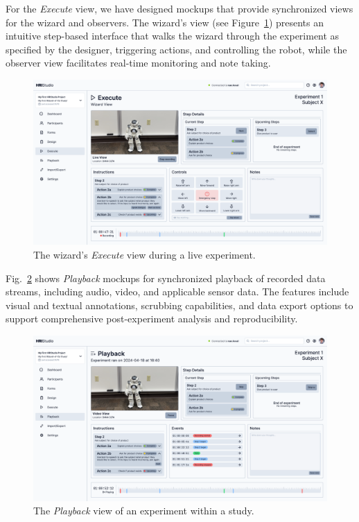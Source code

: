 \documentclass[letterpaper, 10 pt, conference]{ieeeconf}
\begin{document}
For the \emph{Execute} view, we have designed mockups that provide synchronized views for the wizard and observers. The wizard's view (see Figure~\ref{fig:execute}) presents an intuitive step-based interface that walks the wizard through the experiment as specified by the designer, triggering actions, and controlling the robot, while the observer view facilitates real-time monitoring and note taking.

\begin{figure}
\vskip -0.3cm
    \centering
        \includegraphics[width=0.4\paperwidth]{assets/mockups/execute}
         \vskip -0.3cm
        \caption{The wizard's \emph{Execute} view during a live experiment.}
        \label{fig:execute}
    \vskip -0.9cm
\end{figure}

Fig.~\ref{fig:playback} shows \emph{Playback} mockups for synchronized playback of recorded data streams, including audio, video, and applicable sensor data. The features include visual and textual annotations, scrubbing capabilities, and data export options to support comprehensive post-experiment analysis and reproducibility.

\begin{figure}
    \centering
        \includegraphics[width=0.4\paperwidth]{assets/mockups/playback}
        \vskip -0.3cm
        \caption{The \emph{Playback} view of an experiment within a study.}
        \label{fig:playback}
    \vskip -0.4cm
\end{figure}
\end{document}
